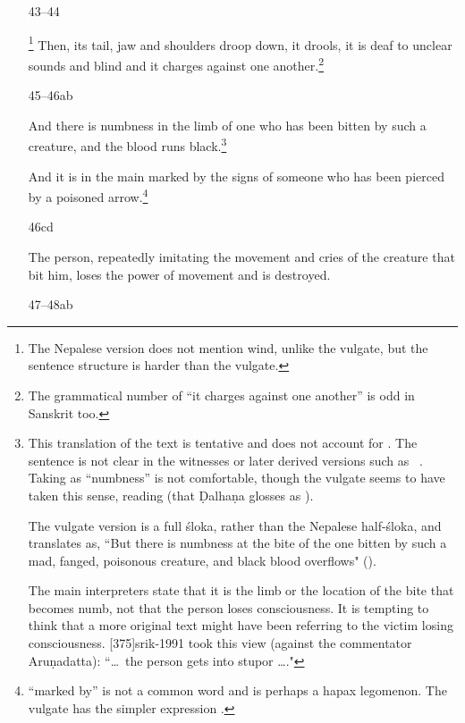 \begin{translation}
\begin{itemize}
\item[43--44]

\footnote{The Nepalese
    version does not mention wind, unlike the vulgate, but the sentence
    structure is harder than the vulgate.}  Then, its tail, jaw and
    shoulders droop down, it drools, it is deaf to unclear sounds and
    blind and it charges against one another.\footnote{The grammatical 
    number of “it charges against one another” is odd in Sanskrit too.}
    
\item[45--46ab]

And there is numbness in the limb of one who has been bitten by such
a creature, and the blood runs black.\footnote{This translation of
    the text is tentative and does not account for .  The
    sentence is not clear in the witnesses or later derived versions such
    as \AH\ .  Taking  as “numbness” is not
    comfortable, though the vulgate seems to have taken this sense, reading 
     (that Ḍalhaṇa glosses as ).
    
The vulgate version is a full śloka, rather than the Nepalese
half-śloka, and translates as, “But there is numbness at the bite of
the one bitten by such a mad, fanged, poisonous creature, and black
blood overflows" ().
    
The main interpreters state that it is the limb or the location of
the bite that becomes numb, not that the person loses consciousness.
It is tempting to think that a more original text might have been
referring to the victim losing consciousness.
[375]{srik-1991} took this view (against the commentator
Aruṇadatta): “\ldots\ the person gets into stupor \ldots ."}

And it is in the main marked by the signs of someone who has been
pierced by a poisoned arrow.\footnote{ “marked by”
    is not a common word and is perhaps a hapax legomenon.  The vulgate
    has the simpler expression .}

\item[46cd]

The person, repeatedly imitating the movement and cries of the creature that 
bit him, loses the power of movement and is destroyed. 

\item [47--48ab]


\end{itemize}
\end{translation}
